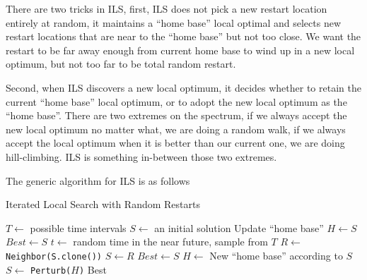                     There are two tricks in ILS, first, ILS does not pick a new restart location entirely at random, it maintains a ``home base'' local optimal and selects new restart locations that are near to the ``home base'' but not too close. We want the restart to be far away enough from current home base to wind up in a new local optimum, but not too far to be total random restart.

                    Second, when ILS discovers a new local optimum, it decides whether to retain the current ``home base'' local optimum, or to adopt the new local optimum as the ``home base''. There are two extremes on the spectrum, if we always accept the new local optimum no matter what, we are doing a random walk, if we always accept the local optimum when it is better than our current one, we are doing hill-climbing. ILS is something in-between those two extremes.

                    The generic algorithm for ILS is as follows
                    \begin{algorithm}[!htp]
                        \centering
                        \caption{Iterated Local Search with Random Restarts}
                        \begin{algorithmic}[1]
                            \State $T \gets$ possible time intervals
                            \State $S \gets$ an initial solution
                            \State Update ``home base'' $H \gets S$
                            \State $Best \gets S$
                                \State $t \gets$ random time in the near future, sample from $T$
                                    \State $R \gets$ \texttt{Neighbor(S.clone())}
                                        \State $S \gets R$
                                    \EndIf
                                        \State $Best \gets S$
                                    \EndIf
                                    \State $H \gets$ New ``home base'' according to $S$
                                    \State $S \gets$ \texttt{Perturb($H$)}
                                \EndWhile
                            \EndWhile
                            \State \Return Best
                        \end{algorithmic}
                    \end{algorithm}


